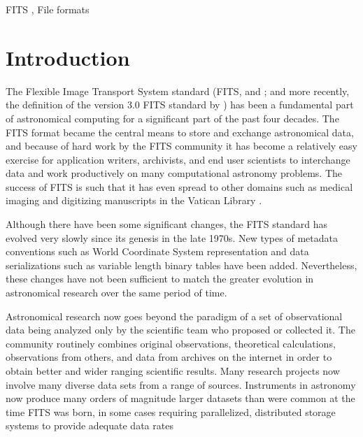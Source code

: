 \documentclass[final,authoryear,5p,times,twocolumn]{elsarticle}
\begin{document}
\begin{frontmatter}
\begin{abstract}
\end{abstract}

\begin{keyword}


FITS \sep
File formats

\end{keyword}

\end{frontmatter}


\newcommand{\aspconf}{ASP Conf.\ Ser}
\newcommand{\aap}{A\&A}
\newcommand{\aaps}{A\&AS}
\newcommand{\jrasc}{JRASC}
\newcommand{\qjras}{QJRAS}

\section{Introduction}


The Flexible Image Transport System standard (FITS,
\citealt{1981A&AS...44..363W} and \citealt{2001A&A...376..359H}; and
more recently, the definition of the version 3.0 FITS standard by
\citealt{2010A&A...524A..42P}) has been a fundamental part of
astronomical computing for a significant part of the past four
decades. The FITS format became the central means to store and
exchange astronomical data, and because of hard work by the FITS
community it has become a relatively easy exercise for application
writers, archivists, and end user scientists to interchange data and
work productively on many computational astronomy problems. The
success of FITS is such that it has even spread to other domains such
as medical imaging and digitizing manuscripts in the Vatican Library
\citep{2006JRASC.100..242W,2012EWASSAlle}.


Although there have been some significant changes, the FITS standard
has evolved very slowly since its genesis in the late 1970s. New types
of metadata conventions such as World Coordinate System
\citep[WCS;][]{2002A&A...395.1061G,2002A&A...395.1077C,2006A&A...446..747G}
representation and data serializations such as variable length binary
tables \citep{1995A&AS..113..159C} have been added. Nevertheless,
these changes have not been sufficient to match the greater evolution
in astronomical research over the same period of time.


Astronomical research now goes beyond the paradigm of a set of
observational data being analyzed only by the scientific team who
proposed or collected it. The community routinely combines original
observations, theoretical calculations, observations from others, and
data from archives on the internet in order to obtain better and wider
ranging scientific results. Many research projects now involve many
diverse data sets from a range of sources. Instruments in astronomy
now produce many orders of magnitude larger datasets than were common
at the time FITS was born, in some cases requiring parallelized,
distributed storage systems to provide adequate data rates
\citep{2012ASPC..461..283A}
\end{document}
